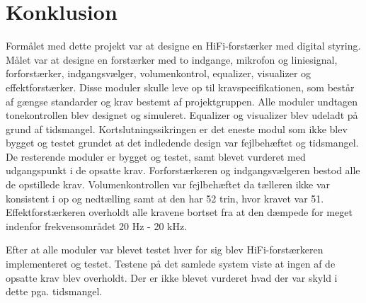 \chapter{Konklusion}
\label{konklusion}

Formålet med dette projekt var at designe en HiFi-forstærker med digital styring. Målet var at designe en forstærker med to indgange, mikrofon og liniesignal, forforstærker, indgangsvælger, volumenkontrol, equalizer, visualizer og effektforstærker. Disse moduler skulle leve op til kravspecifikationen, som består af gængse standarder og krav bestemt af projektgruppen. 
Alle moduler undtagen tonekontrollen blev designet og simuleret. Equalizer og visualizer blev udeladt på grund af tidsmangel. Kortslutningssikringen er det eneste modul som ikke blev bygget og testet grundet at det indledende design var fejlbehæftet og tidsmangel. De resterende moduler er bygget og testet, samt blevet vurderet med udgangspunkt i de opsatte krav. 
Forforstærkeren og indgangsvælgeren bestod alle de opstillede krav. Volumenkontrollen var fejlbehæftet da tælleren ikke var konsistent i op og nedtælling samt at den har 52 trin, hvor kravet var 51. 
Effektforstærkeren overholdt alle kravene bortset fra at den dæmpede for meget indenfor frekvensområdet 20 Hz - 20 kHz. 

Efter at alle moduler var blevet testet hver for sig blev HiFi-forstærkeren implementeret og testet. Testene på det samlede system viste at ingen af de opsatte krav blev overholdt. Der er ikke blevet vurderet hvad der var skyld i dette pga. tidsmangel. 

